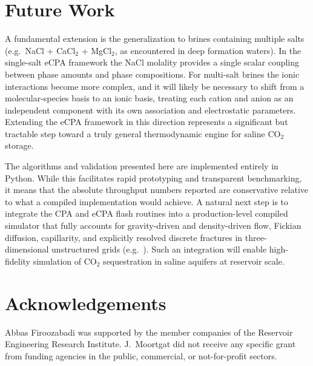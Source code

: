 \documentclass[preprint,12pt,number]{elsarticle}
\begin{document}
\section*{Future Work}
\label{sec:future}

A fundamental extension is the generalization to brines containing
multiple salts (e.g.\ NaCl + CaCl$_2$ + MgCl$_2$, as encountered in deep formation
waters).
In the single-salt eCPA framework the NaCl molality provides a single scalar
coupling between phase amounts and phase compositions.
For multi-salt brines the ionic interactions become more complex, and it will likely
be necessary to shift from a molecular-species basis to an ionic basis, treating each
cation and anion as an independent component with its own association and electrostatic
parameters.
Extending the eCPA framework in this direction represents a significant but tractable
step toward a truly general thermodynamic engine for saline CO$_2$ storage.

The algorithms and validation presented here are implemented entirely in Python.
While this facilitates rapid prototyping and transparent benchmarking, it means that
the absolute throughput numbers reported are conservative relative to what a compiled
implementation would achieve.
A natural next step is to integrate the CPA and eCPA flash routines into a
production-level compiled simulator that fully accounts for gravity-driven and
density-driven flow, Fickian diffusion, capillarity, and explicitly resolved discrete
fractures in three-dimensional unstructured grids (e.g.\
\citealt{moortgat2011compositional, moortgat2011three, moortgat2013higher,
moortgat2016mixed, moortgat2018reservoir, solovsky2025efficient, solovsky2026efficient}).
Such an integration will enable high-fidelity simulation of CO$_2$ sequestration
in saline aquifers at reservoir scale.




\section*{Acknowledgements}

Abbas Firoozabadi was supported by the member companies of the Reservoir Engineering Research Institute.
J.\ Moortgat did not receive any specific grant from funding agencies in the public, commercial, or not-for-profit sectors.
\end{document}
